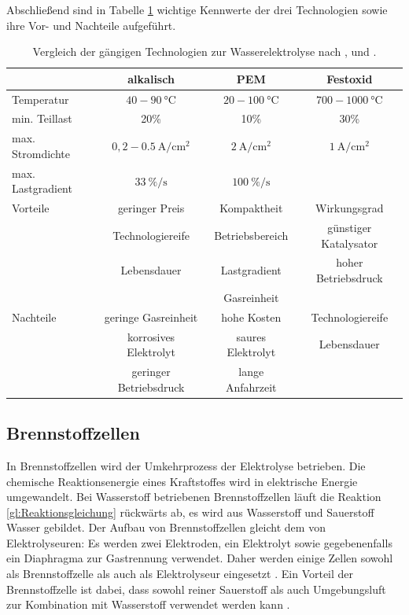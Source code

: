 Abschließend sind in Tabelle \ref{tb:VglElektrolyseur} wichtige Kennwerte der drei Technologien sowie ihre Vor- und Nachteile aufgeführt.

\begin{table}[ht]
		\centering
		\caption{Vergleich der gängigen Technologien zur Wasserelektrolyse nach \citet{milanzi_technischer_2018}, \citet{tremel_electrolysisfundamental_2018} und \citet{rashid_hydrogen_2015}.}
		\begin{tabular}{l c c c}
		\toprule
		 & alkalisch & PEM & Festoxid
		\\
		\midrule
		Temperatur & $40 - \SI{90}{\degreeCelsius}$ & $20 - \SI{100}{\degreeCelsius}$ & $700-\SI{1000}{\degreeCelsius}$\\
		min. Teillast & 20\% & 10\% & 30\% \\
		max. Stromdichte & $0,2 - \SI{0,5}{\A\per\cm\squared}$ & $\SI{2}{\A\per\cm\squared}$ & $\SI{1}{\A\per\cm\squared}$\\
		max. Lastgradient & $\SI{33}{\%\per\s}$ & $\SI{100}{\%\per\s}$ & \\
		\midrule
		Vorteile & geringer Preis & Kompaktheit & Wirkungsgrad\\
		& Technologiereife & Betriebsbereich & günstiger Katalysator\\
		& Lebensdauer & Lastgradient & hoher Betriebsdruck\\
		& & Gasreinheit&\\
		\midrule
		Nachteile & geringe Gasreinheit & hohe Kosten & Technologiereife\\
		& korrosives Elektrolyt & saures Elektrolyt & Lebensdauer\\
		& geringer Betriebsdruck & lange Anfahrzeit & \\
		\bottomrule
		\end{tabular}
		\label{tb:VglElektrolyseur}
\end{table}	

\FloatBarrier

\subsection{Brennstoffzellen}
\label{subsec:BZ}
In Brennstoffzellen wird der Umkehrprozess der Elektrolyse betrieben. Die chemische Reaktionsenergie eines Kraftstoffes wird in elektrische Energie umgewandelt. Bei Wasserstoff betriebenen Brennstoffzellen läuft die Reaktion \ref{gl:Reaktionsgleichung} rückwärts ab, es wird aus Wasserstoff und Sauerstoff Wasser gebildet. Der Aufbau von Brennstoffzellen gleicht dem von Elektrolyseuren: Es werden zwei Elektroden, ein Elektrolyt sowie gegebenenfalls ein Diaphragma zur Gastrennung verwendet. Daher werden einige Zellen sowohl als Brennstoffzelle als auch als Elektrolyseur eingesetzt \citep{yan_performance_2017}. Ein Vorteil der Brennstoffzelle ist dabei, dass sowohl reiner Sauerstoff als auch Umgebungsluft zur Kombination mit Wasserstoff verwendet werden kann \citep{olabi_prospects_2020,jiao_challenges_2017}.\\

